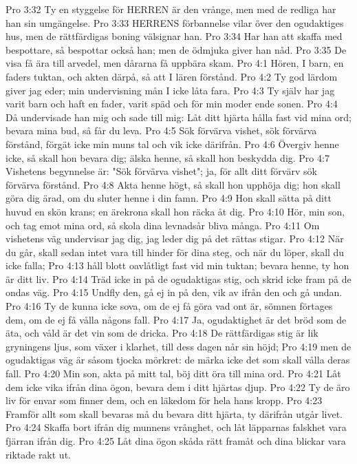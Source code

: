 Pro 3:32  Ty en styggelse för HERREN är den vrånge, men med de redliga har han sin umgängelse.
Pro 3:33  HERRENS förbannelse vilar över den ogudaktiges hus, men de rättfärdigas boning välsignar han.
Pro 3:34  Har han att skaffa med bespottare, så bespottar också han; men de ödmjuka giver han nåd.
Pro 3:35  De visa få ära till arvedel, men dårarna få uppbära skam.
Pro 4:1  Hören, I barn, en faders tuktan, och akten därpå, så att I lären förstånd.
Pro 4:2  Ty god lärdom giver jag eder; min undervisning mån I icke låta fara.
Pro 4:3  Ty själv har jag varit barn och haft en fader, varit späd och för min moder ende sonen.
Pro 4:4  Då undervisade han mig och sade till mig: Låt ditt hjärta hålla fast vid mina ord; bevara mina bud, så får du leva.
Pro 4:5  Sök förvärva vishet, sök förvärva förstånd, förgät icke min muns tal och vik icke därifrån.
Pro 4:6  Övergiv henne icke, så skall hon bevara dig; älska henne, så skall hon beskydda dig.
Pro 4:7  Vishetens begynnelse är: "Sök förvärva vishet"; ja, för allt ditt förvärv sök förvärva förstånd.
Pro 4:8  Akta henne högt, så skall hon upphöja dig; hon skall göra dig ärad, om du sluter henne i din famn.
Pro 4:9  Hon skall sätta på ditt huvud en skön krans; en ärekrona skall hon räcka åt dig.
Pro 4:10  Hör, min son, och tag emot mina ord, så skola dina levnadsår bliva många.
Pro 4:11  Om vishetens väg undervisar jag dig, jag leder dig på det rättas stigar.
Pro 4:12  När du går, skall sedan intet vara till hinder för dina steg, och när du löper, skall du icke falla;
Pro 4:13  håll blott oavlåtligt fast vid min tuktan; bevara henne, ty hon är ditt liv.
Pro 4:14  Träd icke in på de ogudaktigas stig, och skrid icke fram på de ondas väg.
Pro 4:15  Undfly den, gå ej in på den, vik av ifrån den och gå undan.
Pro 4:16  Ty de kunna icke sova, om de ej få göra vad ont är, sömnen förtages dem, om de ej få vålla någons fall.
Pro 4:17  Ja, ogudaktighet är det bröd som de äta, och våld är det vin som de dricka.
Pro 4:18  De rättfärdigas stig är lik gryningens ljus, som växer i klarhet, till dess dagen når sin höjd;
Pro 4:19  men de ogudaktigas väg är såsom tjocka mörkret: de märka icke det som skall vålla deras fall.
Pro 4:20  Min son, akta på mitt tal, böj ditt öra till mina ord.
Pro 4:21  Låt dem icke vika ifrån dina ögon, bevara dem i ditt hjärtas djup.
Pro 4:22  Ty de äro liv för envar som finner dem, och en läkedom för hela hans kropp.
Pro 4:23  Framför allt som skall bevaras må du bevara ditt hjärta, ty därifrån utgår livet.
Pro 4:24  Skaffa bort ifrån dig munnens vrånghet, och låt läpparnas falskhet vara fjärran ifrån dig.
Pro 4:25  Låt dina ögon skåda rätt framåt och dina blickar vara riktade rakt ut.

